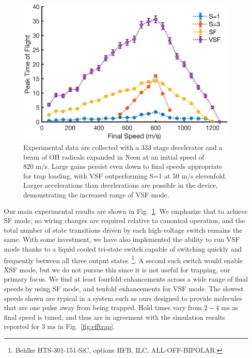 \documentclass[%
 reprint,
 amsmath,amssymb,
 aps,
prl,
]{revtex4-1}
\begin{document}
\begin{figure}[t]
\includegraphics[width=\linewidth]{Data/Data-Figure-Final-Speed.png}%
\caption{\label{fig:alldata}
Experimental data are collected with a $333$ stage decelerator and a beam of OH radicals expanded in Neon at an initial speed of $820\text{ m/s}$. 
Large gains persist even down to final speeds appropriate for trap loading, with VSF outperforming S=1 at $50\text{ m/s}$ elevenfold.
Larger accelerations than decelerations are possible in the device, demonstrating the increased range of VSF mode.\vspace{-4mm}
}
\end{figure}


Our main experimental results are shown in Fig.~\ref{fig:alldata}.
We emphasize that to achieve SF mode, no wiring changes are required relative to canonical operation, and the total number of state transitions driven by each high-voltage switch remains the same.
With some investment, we have also implemented the ability to run VSF mode thanks to a liquid cooled tri-state switch capable of switching quickly and frequently between all three output states~\footnote{Behlke HTS-301-151-SiC, options HFB, ILC, ALL-OFF-BIPOLAR.}.
A second such switch would enable XSF mode, but we do not pursue this since it is not useful for trapping, our primary focus.
We find at least fourfold enhancements across a wide range of final speeds by using SF mode, and tenfold enhancements for VSF mode.
The slowest speeds shown are typical in a system such as ours designed to provide molecules that are one pulse away from being trapped. 
Hold times vary from $2-4\text{ ms}$ as final speed is tuned, and thus are in agreement with the simulation results reported for $3\text{ ms}$ in Fig.~\ref{fig:efftrap}.
\end{document}
